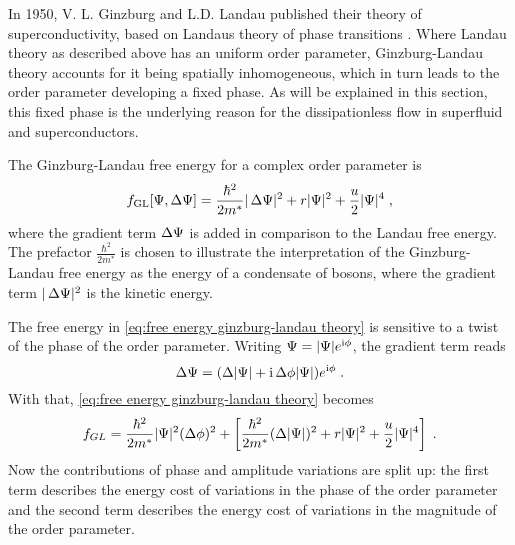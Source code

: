 \documentclass[../notes.tex]{subfiles}
\begin{document}
In 1950, V. L. Ginzburg and L.D. Landau published their theory of superconductivity, based on Landaus theory of phase transitions \cite{ginzburgTheorySuperconductivity1950}.
Where Landau theory as described above has an uniform order parameter, Ginzburg-Landau theory accounts for it being spatially inhomogeneous, which in turn leads to the order parameter developing a fixed phase.
As will be explained in this section, this fixed phase is the underlying reason for the dissipationless flow in superfluid and superconductors.

The Ginzburg-Landau free energy for a complex order parameter is
\begin{equation}
	f_{\mathrm{GL}} [\Psi, \adif{\Psi}] = \frac{\hbar^2}{2m^*} \vert \adif{\Psi} \vert^2 + r \vert \Psi \vert^2 + \frac{u}{2} \vert \Psi \vert^4 \;,
	\label{eq:free energy ginzburg-landau theory}
\end{equation}
where the gradient term \(\adif{\Psi}\) is added in comparison to the Landau free energy.
The prefactor \(\frac{\hbar^2}{2m^*}\) is chosen to illustrate the interpretation of the Ginzburg-Landau free energy as the energy of a condensate of bosons, where the gradient term \(\vert \adif{\Psi} \vert^2\) is the kinetic energy.

The free energy in \cref{eq:free energy ginzburg-landau theory} is sensitive to a twist of the phase of the order parameter.
Writing \(\Psi = \vert \Psi \vert e^{\mathrm{i} \phi}\), the gradient term reads
\begin{equation}
	\Delta \Psi = (\adif{\vert \Psi \vert} + \iu \adif{\phi} \vert \Psi \vert) e^{\iu \phi} \;.
\end{equation}
With that, \cref{eq:free energy ginzburg-landau theory} becomes
\begin{equation}
	f_{GL}  = \frac{\hbar^2}{2m^*} \vert \Psi \vert^2 (\adif{\phi})^2 + \left[ \frac{\hbar^2}{2m^*} (\adif{\vert \Psi \vert})^2 + r \vert \Psi \vert^2 + \frac{u}{2} \vert \Psi \vert^4 \right] \;.
	\label{eq:free energy ginzburg-landau theory with phase}
\end{equation}
Now the contributions of phase and amplitude variations are split up: the first term describes the energy cost of variations in the phase of the order parameter and the second term describes the energy cost of variations in the magnitude of the order parameter.
\end{document}

